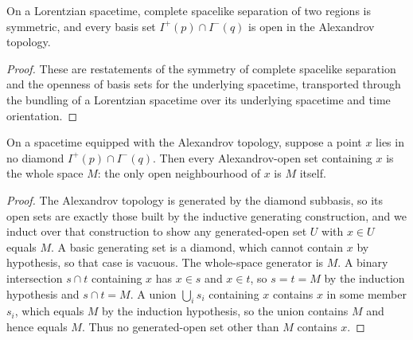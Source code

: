 \begin{lemma}
    \label{lmm:lorentzian-causal-lifts}
    \leanok
    On a Lorentzian spacetime, complete spacelike separation of two regions is symmetric, and every basis set $I^+(p) \cap I^-(q)$ is open in the Alexandrov topology.
\end{lemma}
\begin{proof}
    \leanok
    These are restatements of the symmetry of complete spacelike separation and the openness of basis sets for the underlying spacetime, transported through the bundling of a Lorentzian spacetime over its underlying spacetime and time orientation.
\end{proof}

\begin{lemma}
    \label{lmm:alexandrov-nbhd-univ-of-no-diamond}
    \leanok
    On a spacetime equipped with the Alexandrov topology, suppose a point $x$ lies in no diamond $I^+(p) \cap I^-(q)$. Then every Alexandrov-open set containing $x$ is the whole space $M$: the only open neighbourhood of $x$ is $M$ itself.
\end{lemma}
\begin{proof}
    \leanok
    The Alexandrov topology is generated by the diamond subbasis, so its open sets are exactly those built by the inductive generating construction, and we induct over that construction to show any generated-open set $U$ with $x \in U$ equals $M$. A basic generating set is a diamond, which cannot contain $x$ by hypothesis, so that case is vacuous. The whole-space generator is $M$. A binary intersection $s \cap t$ containing $x$ has $x \in s$ and $x \in t$, so $s = t = M$ by the induction hypothesis and $s \cap t = M$. A union $\bigcup_i s_i$ containing $x$ contains $x$ in some member $s_i$, which equals $M$ by the induction hypothesis, so the union contains $M$ and hence equals $M$. Thus no generated-open set other than $M$ contains $x$.
\end{proof}

